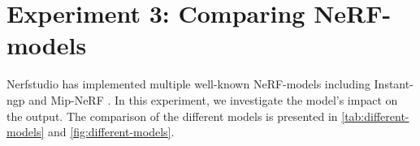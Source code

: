 \begin{comment}
This subsection presents an experiment designed to assess the relative merits of two distinct strategies for refining initial camera poses. Specifically, we compare the direct optimization of rough camera poses within the model training pipeline against the pre-processing of such poses with the help of COLMAP. The main question under investigation here is whether the benefits of optimizing the rough camera poses directly can outweigh those of employing a sophisticated SfM tool like COLMAP, despite the potential for a more substantial time investment.

might offer the benefit of faster processing time, COLMAP consistently delivers superior performance across all metrics, regardless of segment size.
COLMAP doesn't optimize initial poses, but instead approximates camera poses from a set of input images. 
Comparing those results with \autoref{tab:colmap-vs-poses}, we observe that the runs with poses approximated by COLMAP deliver superior performance
Comparing the results in \autoref{tab:colmap-vs-poses} and \autoref{tab:exp-gaussian-noise} it becomes apparent that although direct pose optimization might offer the benefit of faster processing time, COLMAP consistently delivers superior performance across all metrics, regardless of segment size. The results thus suggest that employing COLMAP for initial pose refinement could significantly improve model performance when the initial camera poses are inaccurate, despite the longer processing time required.
\end{comment}











\newpage

\section{Experiment 3: Comparing NeRF-models}
Nerfstudio has implemented multiple well-known NeRF-models including Instant-ngp \cite{muller_instant_2022} and Mip-NeRF \cite{barron_mip-nerf_2021}. In this experiment, we investigate the model's impact on the output. The comparison of the different models is presented in \autoref{tab:different-models} and \autoref{fig:different-models}.

